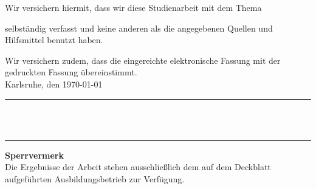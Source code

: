 Wir versichern hiermit, dass wir diese Studienarbeit mit dem Thema
\begin{quote}
\textit{\titel} \textit{ \untertitel }
\end{quote}
selbständig verfasst und keine anderen als die angegebenen Quellen und Hilfsmittel benutzt haben.


Wir versichern zudem, dass die eingereichte elektronische Fassung mit der gedruckten Fassung übereinstimmt.\\[10ex]

Karlsruhe, den \today \\[4ex]


\rule[-0.2cm]{5cm}{0.5pt} \\

\textsc{\autor} \\[10ex]

\hrule 
\vspace*{1.0cm}
\noindent \textbf{\Large{Sperrvermerk}}\\
\normalsize
Die Ergebnisse der Arbeit stehen ausschließlich dem auf dem Deckblatt aufgeführten Ausbildungsbetrieb zur Verfügung.